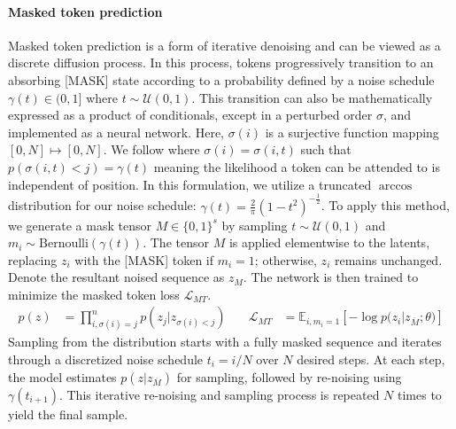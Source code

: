 \paragraph{Masked token prediction}
Masked token prediction is a form of iterative denoising and can be viewed as a discrete diffusion process. In this process, tokens progressively transition to an absorbing [MASK] state according to a probability defined by a noise schedule \(\gamma(t) \in (0, 1]\) where $t \sim \mathcal{U}(0, 1)$. This transition can also be mathematically expressed as a product of conditionals, except in a perturbed order $\sigma$, and implemented as a neural network. Here, \(\sigma(i)\) is a surjective function mapping \([0, N] \mapsto [0, N]\). We follow \cite{chang2022maskgit, chang2023muse} where $\sigma(i) = \sigma(i, t)$ such that \(p(\sigma(i, t) < j) = \gamma(t)\) meaning the likelihood a token can be attended to is independent of position. In this formulation, we utilize a truncated \( \arccos \) distribution for our noise schedule: $\gamma(t) = \frac{2}{\pi} (1 - t^2)^{-\frac{1}{2}}$. To apply this method, we generate a mask tensor \(M \in \{0, 1\}^s\) by sampling \(t \sim \mathcal{U}(0, 1)\) and \(m_i \sim \text{Bernoulli}(\gamma(t))\). The tensor \(M\) is applied elementwise to the latents, replacing \(z_i\) with the [MASK] token if \(m_i = 1\); otherwise, \(z_i\) remains unchanged. Denote the resultant noised sequence as \(z_M\). The network is then trained to minimize the masked token loss \(\mathcal{L}_{MT}\).
\vspace{-2pt}
\begin{align}
p(z) &= \prod_{i, \sigma(i) = j}^{n} p(z_j | z_{\sigma(i) < j}) & \quad \mathcal{L}_{MT} &= \mathbb{E}_{i, m_i=1} [ -\log{p(z_i | z_{\overline{M}}; \theta}) ]
\end{align}
\vspace{-2pt}
Sampling from the distribution starts with a fully masked sequence and iterates through a discretized noise schedule \(t_i = i/N\) over \(N\) desired steps. At each step, the model estimates \(p(z | z_{\overline{M}})\) for sampling, followed by re-noising using \(\gamma(t_{i+1})\). This iterative re-noising and sampling process is repeated \(N\) times to yield the final sample.

